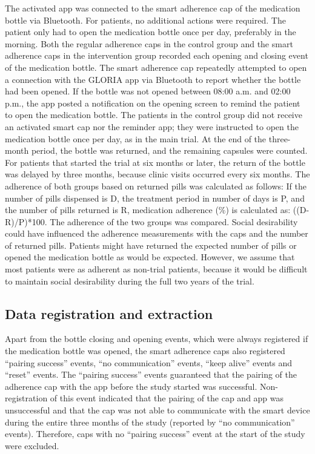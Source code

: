 \documentclass[twocolumn, issue, empirical, authordate]{jote-new-article}
\begin{document}
 The activated app was connected to the smart adherence cap of the medication bottle via Bluetooth. For patients, no additional actions were required. The patient only had to open the medication bottle once per day, preferably in the morning. Both the regular adherence caps in the control group and the smart adherence caps in the intervention group recorded each opening and closing event of the medication bottle. The smart adherence cap repeatedly attempted to open a connection with the GLORIA app via Bluetooth to report whether the bottle had been opened.
If the bottle was not opened between 08:00 a.m. and 02:00 p.m., the app posted a notification on the opening screen to remind the patient to open the medication bottle. The patients in the control group did not receive an activated smart cap nor the reminder app; they were instructed to open the medication bottle once per day, as in the main trial. At the end of the three-month period, the bottle was returned, and the remaining capsules were counted. For patients that started the trial at six months or later, the return of the bottle was delayed by three months, because clinic visits occurred every six months. The adherence of both groups based on returned pills was calculated as follows: If the number of pills dispensed is D, the treatment period in number of days is P, and the number of pills returned is R, medication adherence (\%) is calculated as: ((D-R)/P)*100. The adherence of the two groups was compared.
 Social desirability could have influenced the adherence measurements with the caps and the number of returned pills. Patients might have returned the expected number of pills or opened the medication bottle as would be expected. However, we assume that most patients were as adherent as non-trial patients, because it would be difficult to maintain social desirability during the full two years of the trial.


\subsection{Data registration and extraction}

 Apart from the bottle closing and opening events, which were always registered if the medication bottle was opened, the smart adherence caps also registered ``pairing success'' events, ``no communication'' events, ``keep alive'' events and ``reset'' events.
 The ``pairing success'' events guaranteed that the pairing of the adherence cap with the app before the study started was successful.
Non-registration of this event indicated that the pairing of the cap and app was unsuccessful and that the cap was not able to communicate with the smart device during the entire three months of the study (reported by ``no communication'' events). Therefore, caps with no ``pairing success'' event at the start of the study were excluded.
\end{document}
